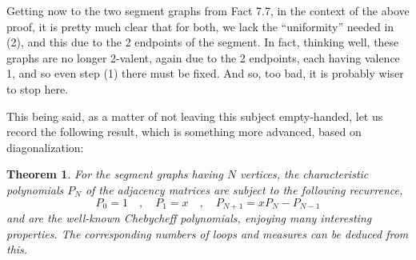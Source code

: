 \documentclass[12pt]{amsbook}
\newtheorem{theorem}{Theorem}[chapter]
\begin{document}
Getting now to the two segment graphs from Fact 7.7, in the context of the above proof, it is pretty much clear that for both, we lack the ``uniformity'' needed in (2), and this due to the 2 endpoints of the segment. In fact, thinking well, these graphs are no longer 2-valent, again due to the 2 endpoints, each having valence 1, and so even step (1) there must be fixed. And so, too bad, it is probably wiser to stop here.

\bigskip

This being said, as a matter of not leaving this subject empty-handed, let us record the following result, which is something more advanced, based on diagonalization:


\begin{theorem}
For the segment graphs having $N$ vertices, the characteristic polynomials $P_N$ of the adjacency matrices are subject to the following recurrence, 
$$P_0=1\quad,\quad P_1=x\quad,\quad P_{N+1}=xP_N-P_{N-1}$$
and are the well-known Chebycheff polynomials, enjoying many interesting properties. The corresponding numbers of loops and measures can be deduced from this.
\end{theorem} 
\end{document}
